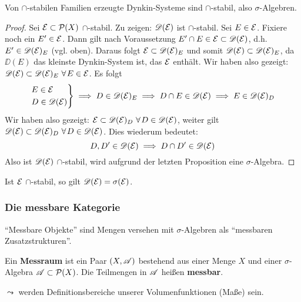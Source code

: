 \begin{satz}
\begin{mdframed}
Von $\cap$-stabilen Familien erzeugte Dynkin-Systeme sind $\cap$-stabil, also $\sigma$-Algebren.
\end{mdframed}
\begin{proof}
Sei $\EE \subset \PP(X)$ $\cap$-stabil. Zu zeigen: $\DD(\EE)$ ist $\cap$-stabil. Sei $E \in \EE$. Fixiere noch ein $E' \in \EE$. Dann gilt nach Voraussetzung $E' \cap E \in \EE \subset \DD(\EE)$, d.h. $E' \in \DD(\EE)_E$ (vgl. oben). Daraus folgt $\EE \subset \DD(\EE)_E$ und somit $\DD(\EE) \subset \DD(\EE)_E$, da $\DD(E)$ das kleinste Dynkin-System ist, das $\EE$ enthält. Wir haben also gezeigt: $\DD(\EE)\subset \DD(\EE)_E \ \forall E \in \EE$. Es folgt
\begin{equation*}
\begin{rcases}
	E \in \EE \\
	D \in \DD(\EE)
\end{rcases}
\implies 
D \in \DD(\EE)_E\implies
D \cap E \in \DD(\EE) \implies E \in \DD(\EE)_D
\end{equation*}
Wir haben also gezeigt: $\EE \subset \DD(\EE)_D \ \forall D \in \DD(\EE)$, weiter gilt $\DD(\EE)\subset \DD(\EE)_D \ \forall D \in \DD(\EE)$. Dies wiederum bedeutet:
\begin{equation*}
	D,D' \in \DD(\EE) \implies D \cap  D' \in \DD(\EE)
\end{equation*}
Also ist $\DD(\EE)$ $\cap$-stabil, wird aufgrund der letzten Proposition eine $\sigma$-Algebra.
\end{proof}
\begin{remark}
Ist $\EE$ $\cap$-stabil, so gilt $\DD(\EE) =\sigma (\EE)$.
\end{remark}
\end{satz}
\subsubsection{Die messbare Kategorie}
``Messbare Objekte'' sind Mengen versehen mit $\sigma$-Algebren als ``messbaren Zusatzstrukturen''.
\begin{definition}
\begin{mdframed}
Ein \textbf{Messraum} ist ein Paar $(X,\AA)$ bestehend aus einer Menge $X$ und einer $\sigma$-Algebra $\AA \subset \PP(X)$. Die Teilmengen in $\AA$ heißen \textbf{messbar}.
\end{mdframed}
\end{definition}
$\leadsto$ werden Definitionsbereiche unserer Volumenfunktionen (Maße) sein.

